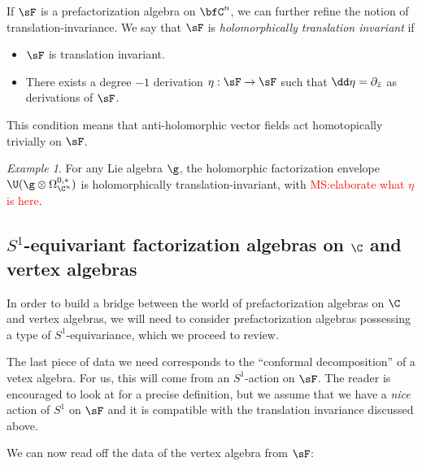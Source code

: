 \documentclass[12pt]{amsart}
\theoremstyle{definition}
\theoremstyle{remark}
\newtheorem{eg}[theorem]{Example}
\def\matt{\textcolor{red}{MS:}\textcolor{red}}
\begin{document}
If $\sF$ is a
prefactorization algebra on $\bfC^n$, we can further refine the notion of translation-invariance. 
We say that $\sF$ is {\it holomorphically translation invariant}
if
\begin{itemize}
\item $\sF$ is translation invariant. 
\item There exists a degree $-1$ derivation $\eta: \sF \to
  \sF$ such that $\dd \eta = \partial_{\Bar{z}}$ as derivations of
  $\sF$. 
\end{itemize}

This condition means that anti-holomorphic vector fields act homotopically trivially on $\sF$. 

\begin{eg}
For any Lie algebra $\g$, the holomorphic factorization envelope $\U(\g \otimes \Omega^{0,*}_{\C^n})$ is holomorphically translation-invariant, with \matt{elaborate what $\eta$ is here}.
\end{eg}


\subsection{$S^1$-equivariant factorization algebras on $\C$ and vertex algebras}

In order to build a bridge between the world of prefactorization algebras on $\C$ and vertex algebras, we will need to consider prefactorization algebras possessing a type of $S^1$-equivariance, which we proceed to review. 

The last piece of data we need corresponds to the ``conformal
decomposition'' of a vetex algebra. For us, this will come from an
$S^1$-action on $\sF$. The reader is encouraged to look at
\cite{CG} for a precise definition, but we assume that we have a {\it
  nice} action of $S^1$ on $\sF$ and it is compatible with the
translation invariance discussed above. 

We can now read off the data of the
vertex algebra from $\sF$:
\end{document}
